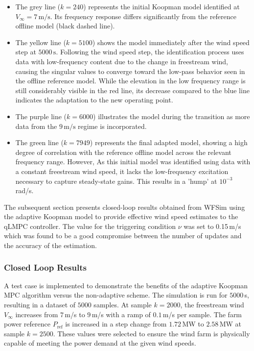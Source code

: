 \begin{itemize}
    \item The grey line ($k = 240$) represents the initial Koopman model identified at $V_{\infty} = 7\,\mathrm{m/s}$. Its frequency response differs significantly from the reference offline model (black dashed line).
    \item The yellow line ($k = 5100$) shows the model immediately after the wind speed step at $5000\,\mathrm{s}$. Following the wind speed step, the identification process uses data with low-frequency content due to the change in freestream wind, causing the singular values to converge toward the low-pass behavior seen in the offline reference model. While the elevation in the low frequency range is still considerably visible in the red line, its decrease compared to the blue line indicates the adaptation to the new operating point.
    \item The purple line ($k = 6000$) illustrates the model during the transition as more data from the $9\,\mathrm{m/s}$ regime is incorporated.
    \item The green line ($k = 7949$) represents the final adapted model, showing a high degree of correlation with the reference offline model across the relevant frequency range. However, As this initial model was identified using data with a constant freestream wind speed, it lacks the low-frequency excitation necessary to capture steady-state gains. This results in a 'hump' at $10^{-3}$\,rad/s.
\end{itemize}


The subsequent section presents closed-loop results obtained from WFSim using the adaptive Koopman model to provide effective wind speed estimates to the qLMPC controller. The value for the triggering condition $\nu$ was set to 0.15\,m/s which was found to be a good compromise between the number of updates and the accuracy of the estimation.

\subsubsection{Closed Loop Results}
A test case is implemented to demonstrate the benefits of the adaptive Koopman MPC algorithm versus the non-adaptive scheme. The simulation is run for $5000$\,s, resulting in a dataset of $5000$ samples. At sample $k = 2000$, the freestream wind $V_\infty$ increases from $7$\,m/s to $9$\,m/s with a ramp of $0.1$\,m/s per sample. The farm power reference $P_{\text{ref}}$ is increased in a step change from $1.72$\,MW to $2.58$\,MW at sample $k = 2500$. These values were selected to ensure the wind farm is physically capable of meeting the power demand at the given wind speeds.

